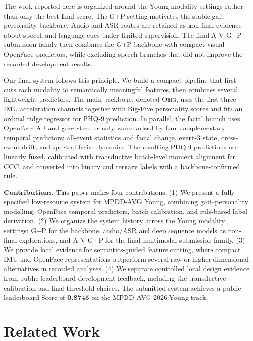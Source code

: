 \documentclass[sigconf,screen,review]{acmart}
\begin{document}
The work reported here is organized around the Young modality settings rather
than only the best final score. The G+P setting motivates the stable
gait--personality backbone. Audio and ASR routes are retained as non-final
evidence about speech and language cues under limited supervision. The final
A-V-G+P submission family then combines the G+P backbone with compact visual
OpenFace predictors, while excluding speech branches that did not improve the
recorded development results.

Our final system follows this principle. We build a compact pipeline that first cuts each modality to semantically meaningful features, then combines several lightweight predictors. The main backbone, denoted \textsc{Orig}, uses the first three IMU acceleration channels together with Big-Five personality scores and fits an ordinal ridge regressor for PHQ-9 prediction. In parallel, the facial branch uses OpenFace AU and gaze streams only, summarised by four complementary temporal predictors: all-event statistics and facial change, event-3 state, cross-event drift, and spectral facial dynamics. The resulting PHQ-9 predictions are linearly fused, calibrated with transductive batch-level moment alignment for CCC, and converted into binary and ternary labels with a backbone-confirmed rule.

\noindent\textbf{Contributions.}
This paper makes four contributions. (1) We present a fully specified
low-resource system for MPDD-AVG Young, combining gait--personality modelling,
OpenFace temporal predictors, batch calibration, and rule-based label
derivation. (2) We organize the system history across the Young modality
settings: G+P for the backbone, audio/ASR and deep sequence models as non-final
explorations, and A-V-G+P for the final multimodal submission family. (3) We
provide local evidence for semantics-guided feature cutting, where compact IMU
and OpenFace representations outperform several raw or higher-dimensional
alternatives in recorded analyses. (4) We separate controlled local design
evidence from public-leaderboard development feedback, including the
transductive calibration and final threshold choices. The submitted system
achieves a public leaderboard Score of \textbf{0.8745} on the MPDD-AVG 2026
Young track.
\section{Related Work}
\end{document}
